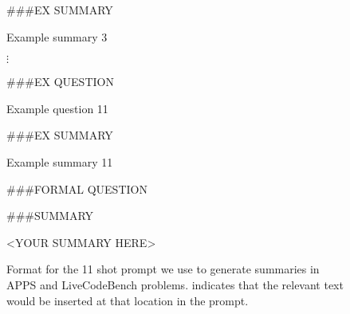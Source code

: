 \begin{figure*}[ht]
{{\#\#\#EX SUMMARY

  \vspace{0.2cm}

 Example summary 3

$\vdots$

  \vspace{0.4cm}

\#\#\#EX QUESTION

  \vspace{0.2cm}
  
 Example question 11

  \vspace{0.4cm}

  \#\#\#EX SUMMARY

  \vspace{0.2cm}
  
  Example summary 11

  \vspace{0.4cm}

  \#\#\#FORMAL QUESTION
  
    \vspace{0.2cm}
    
  
  \vspace{0.4cm}
  
  \#\#\#SUMMARY
  
    \vspace{0.2cm}
    
  <YOUR SUMMARY HERE>
 
        }
        
    }
    \caption{Format for the 11 shot prompt we use to generate summaries in APPS and LiveCodeBench problems.  indicates that the relevant text would be inserted at that location in the prompt.}
    \label{prompts:summarization_apps_lcb}
\end{figure*}